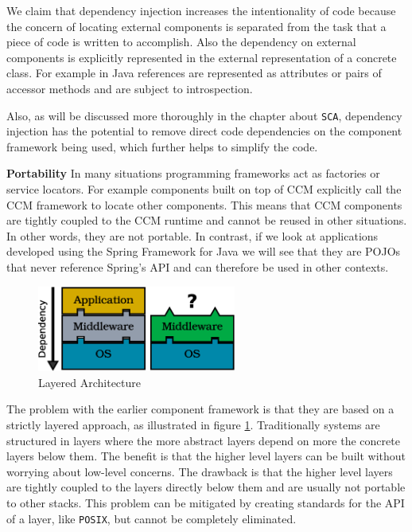 We claim that dependency injection increases the intentionality of code because the concern of locating external
components is separated from the task that a piece of code is written to accomplish. Also the dependency on external
components is explicitly represented in the external representation of a concrete class. For example in Java
references are represented as attributes or pairs of accessor methods and are subject to introspection.

Also, as will be discussed more thoroughly in the chapter about \texttt{SCA}, dependency injection has the potential
to remove direct code dependencies on the component framework being used, which further helps to simplify the
code.

\textbf{Portability} In many situations programming frameworks act as factories or service locators. For example
components built on top of CCM explicitly call the CCM framework to locate other components. This means that CCM
components are tightly coupled to the CCM runtime and cannot be reused in other situations. In other words, they
are not portable. In contrast, if we look at applications developed using the Spring Framework for Java we will
see that they are POJOs that never reference Spring's API and can therefore be used in other contexts.

\begin{figure}
\centering
\includegraphics[height=80pt]{graphics_tables/bad_layers.eps} 
\caption{Layered Architecture}
\label{fig:bad_layers}
\end{figure}

The problem with the earlier component framework is that they are based on a strictly layered approach, as illustrated in figure
\ref{fig:bad_layers}. Traditionally systems are structured in layers where the more abstract layers depend on more the concrete
layers below them. The benefit is that the higher level layers can be built without worrying about low-level concerns. The
drawback is that the higher level layers are tightly coupled to the layers directly below them and are usually not portable
to other stacks. This problem can be mitigated by creating standards for the API of a layer, like \texttt{POSIX}, but cannot
be completely eliminated. 


